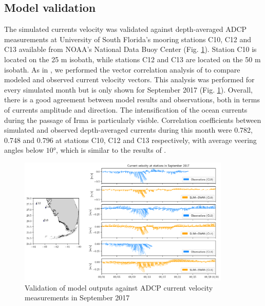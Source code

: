 \documentclass[fleqn,10pt]{wlscirep}
\begin{document}
\subsection*{Model validation}
The simulated currents velocity was validated against depth-averaged ADCP measurements at University of South Florida's mooring stations C10, C12 and C13 available from NOAA's National Data Buoy Center (Fig. \ref{fig:validation}). Station C10 is located on the 25 m isobath, while stations C12 and C13 are located on the 50 m isobath. As in \cite{liu2020impacts}, we performed the vector correlation analysis of \citep{kundu1976ekman} to compare modeled and observed current velocity vectors. This analysis was performed for every simulated month but is only shown for September 2017 (Fig. \ref{fig:validation}). Overall, there is a good agreement between model results and observations, both in terms of currents amplitude and direction. The intensification of the ocean currents during the passage of Irma is particularly visible. Correlation coefficients between simulated and observed depth-averaged currents during this month were 0.782, 0.748 and 0.796 at stations C10, C12 and C13 respectively, with average veering angles below $10$°, which is similar to the results of \cite{liu2020impacts}.

\begin{figure}
    \centering
    \includegraphics[width=0.9\textwidth]{figures/validation_uv_map.png}
    \caption{Validation of model outputs against ADCP current velocity measurements in September 2017}
    \label{fig:validation}
\end{figure}
\end{document}
